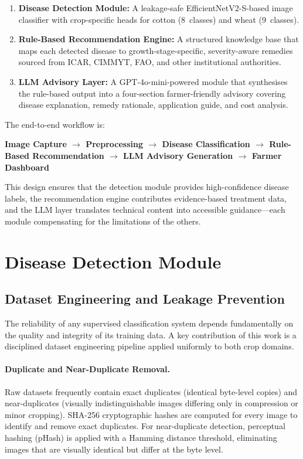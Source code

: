 \documentclass[12pt,a4paper]{report}
\begin{document}
\begin{enumerate}
    \item \textbf{Disease Detection Module:} A leakage-safe EfficientNetV2-S-based image classifier with crop-specific heads for cotton (8~classes) and wheat (9~classes).
    \item \textbf{Rule-Based Recommendation Engine:} A structured knowledge base that maps each detected disease to growth-stage-specific, severity-aware remedies sourced from ICAR, CIMMYT, FAO, and other institutional authorities.
    \item \textbf{LLM Advisory Layer:} A GPT-4o-mini-powered module that synthesises the rule-based output into a four-section farmer-friendly advisory covering disease explanation, remedy rationale, application guide, and cost analysis.
\end{enumerate}

The end-to-end workflow is:
\begin{center}
\textbf{Image Capture $\rightarrow$ Preprocessing $\rightarrow$ Disease Classification $\rightarrow$ Rule-Based Recommendation $\rightarrow$ LLM Advisory Generation $\rightarrow$ Farmer Dashboard}
\end{center}

This design ensures that the detection module provides high-confidence disease labels, the recommendation engine contributes evidence-based treatment data, and the LLM layer translates technical content into accessible guidance---each module compensating for the limitations of the others.

\section{Disease Detection Module}

\subsection{Dataset Engineering and Leakage Prevention}
The reliability of any supervised classification system depends fundamentally on the quality and integrity of its training data. A key contribution of this work is a disciplined dataset engineering pipeline applied uniformly to both crop domains.

\paragraph{Duplicate and Near-Duplicate Removal.}
Raw datasets frequently contain exact duplicates (identical byte-level copies) and near-duplicates (visually indistinguishable images differing only in compression or minor cropping). SHA-256 cryptographic hashes are computed for every image to identify and remove exact duplicates. For near-duplicate detection, perceptual hashing (pHash) is applied with a Hamming distance threshold, eliminating images that are visually identical but differ at the byte level.
\end{document}
